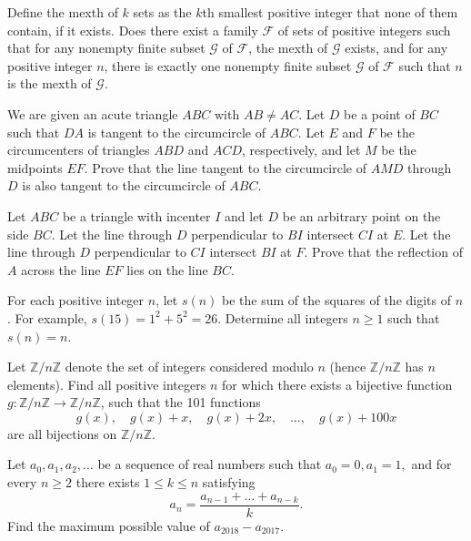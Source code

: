 \documentclass[11pt]{scrartcl}
\begin{document}
\begin{problem}[6568001756330762063]
Define the mexth of \(k\) sets as the \(k\)th smallest positive integer that none of them contain, if it exists. Does there exist a family \(\mathcal F\) of sets of positive integers such that
for any nonempty finite subset \(\mathcal G\) of \(\mathcal F\), the mexth of \(\mathcal G\) exists, and
for any positive integer \(n\), there is exactly one nonempty finite subset \(\mathcal G\) of \(\mathcal F\) such that \(n\) is the mexth of \(\mathcal G\).
\end{problem}
\begin{problem}[453148723429253]
	We are given an acute triangle $ABC$ with $AB\neq AC$. Let $D$ be a point of $BC$ such that $DA$ is tangent to the circumcircle of $ABC$. Let $E$ and $F$ be the circumcenters of triangles $ABD$ and $ACD$, respectively, and let $M$ be the midpoints $EF$. Prove that the line tangent to the circumcircle of $AMD$ through $D$ is also tangent to the circumcircle of $ABC$.
\end{problem}
\begin{problem}[704326412238502]
	Let $ABC$ be a triangle with incenter $I$ and let $D$ be an arbitrary point on the side $BC$. Let the line through $D$ perpendicular to $BI$ intersect $CI$ at $E$. Let the line through $D$ perpendicular to $CI$ intersect $BI$ at $F$. Prove that the reflection of $A$ across the line $EF$ lies on the line $BC$.
\end{problem}
\begin{problem}[5707875418806483255]
For each positive integer $n$, let $s(n)$ be the sum of the squares of the digits of $n$. For example, $s(15)=1^2+5^2=26$. Determine all integers $n\geq 1$ such that $s(n)=n$.
\end{problem}
\begin{problem}[1856371892766039579]
Let $\mathbb{Z}/n\mathbb{Z}$ denote the set of integers considered modulo $n$ (hence $\mathbb{Z}/n\mathbb{Z}$ has $n$ elements). Find all positive integers $n$ for which there exists a bijective function $g: \mathbb{Z}/n\mathbb{Z} \to \mathbb{Z}/n\mathbb{Z}$, such that the 101 functions
\[g(x), \quad g(x) + x, \quad g(x) + 2x, \quad \dots, \quad g(x) + 100x\]are all bijections on $\mathbb{Z}/n\mathbb{Z}$.
\end{problem}
\begin{problem}[3923745101517032298]
	Let $a_0,a_1,a_2,\dots $ be a sequence of real numbers such that $a_0=0, a_1=1,$ and for every $n\geq 2$ there exists $1 \leq k \leq n$ satisfying\[ a_n=\frac{a_{n-1}+\dots + a_{n-k}}{k}. \]Find the maximum possible value of $a_{2018}-a_{2017}$.
\end{problem}
\end{document}

